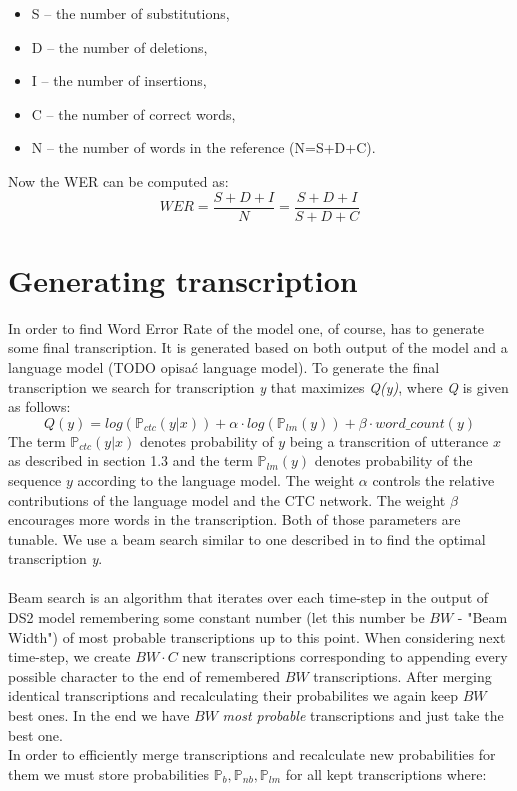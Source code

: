 \documentclass[licencjacka,en]{pracamgr}
\begin{document}
\begin{itemize}
  \item S -- the number of substitutions,
  \item D -- the number of deletions,
  \item I -- the number of insertions,
  \item C -- the number of correct words,
  \item N -- the number of words in the reference (N=S+D+C).
\end{itemize}
Now the WER can be computed as:
$$
WER = \frac{S + D + I}{N} = \frac{S + D + I}{S + D + C}
$$

\section{Generating transcription}
In order to find Word Error Rate of the model one, of course, has to generate some final transcription. It is generated based on both output of the model and a language model (TODO opisać language model). To generate the final transcription we search for transcription \textit{y} that maximizes \textit{Q(y)}, where \textit{Q} is given as follows:
$$
Q(y) = log(\mathbb{P}_{ctc}(y|x)) + \alpha \cdot log(\mathbb{P}_{lm}(y)) + \beta \cdot word\_count(y)
$$
The term $\mathbb{P}_{ctc}(y|x)$ denotes probability of $y$ being a transcrition of utterance $x$ as described in section 1.3 and the term $\mathbb{P}_{lm}(y)$ denotes probability of the sequence $y$ according to the language model. The weight $\alpha$ controls the relative contributions of the language model and the CTC network. The weight $\beta$ encourages more words in the transcription. Both of those parameters are tunable. We use a beam search similar to one described in \cite{DS7} to find the optimal transcription \textit{y}.\\\\
Beam search is an algorithm that iterates over each time-step in the output of DS2 model remembering some constant number (let this number be $BW$ - "Beam Width") of most probable transcriptions up to this point. When considering next time-step, we create $BW \cdot C$ new transcriptions corresponding to appending every possible character to the end of remembered $BW$ transcriptions. After merging identical transcriptions and recalculating their probabilites we again keep $BW$ best ones. In the end we have $BW$ \textit{most probable} transcriptions and just take the best one.\\
In order to efficiently merge transcriptions and recalculate new probabilities for them we must store probabilities $\mathbb{P}_{b}, \mathbb{P}_{nb}, \mathbb{P}_{lm}$ for all kept transcriptions where:
\end{document}
